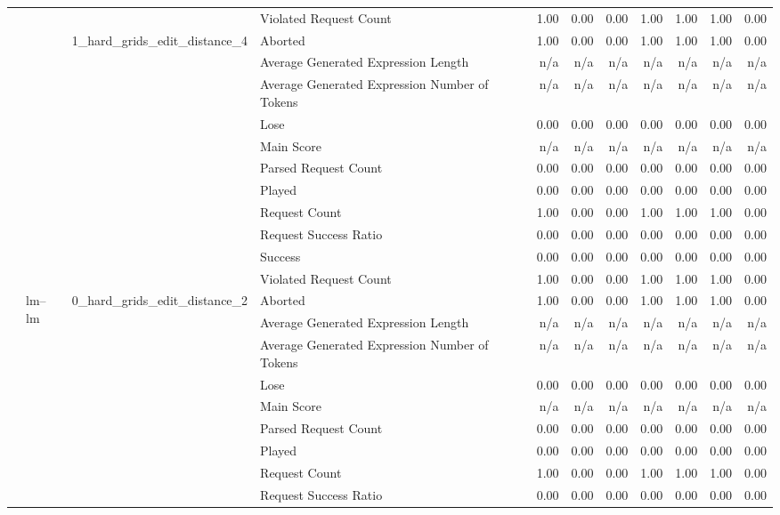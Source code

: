 \begin{tabular}{llllrrrrrrr}
 &  &  & Violated Request Count & 1.00 & 0.00 & 0.00 & 1.00 & 1.00 & 1.00 & 0.00 \\
\cline{3-11}
 &  & \multirow[t]{11}{*}{1_hard_grids_edit_distance_4} & Aborted & 1.00 & 0.00 & 0.00 & 1.00 & 1.00 & 1.00 & 0.00 \\
 &  &  & Average Generated Expression Length & n/a & n/a & n/a & n/a & n/a & n/a & n/a \\
 &  &  & Average Generated Expression Number of Tokens & n/a & n/a & n/a & n/a & n/a & n/a & n/a \\
 &  &  & Lose & 0.00 & 0.00 & 0.00 & 0.00 & 0.00 & 0.00 & 0.00 \\
 &  &  & Main Score & n/a & n/a & n/a & n/a & n/a & n/a & n/a \\
 &  &  & Parsed Request Count & 0.00 & 0.00 & 0.00 & 0.00 & 0.00 & 0.00 & 0.00 \\
 &  &  & Played & 0.00 & 0.00 & 0.00 & 0.00 & 0.00 & 0.00 & 0.00 \\
 &  &  & Request Count & 1.00 & 0.00 & 0.00 & 1.00 & 1.00 & 1.00 & 0.00 \\
 &  &  & Request Success Ratio & 0.00 & 0.00 & 0.00 & 0.00 & 0.00 & 0.00 & 0.00 \\
 &  &  & Success & 0.00 & 0.00 & 0.00 & 0.00 & 0.00 & 0.00 & 0.00 \\
 &  &  & Violated Request Count & 1.00 & 0.00 & 0.00 & 1.00 & 1.00 & 1.00 & 0.00 \\
\cline{2-11} \cline{3-11}
 & \multirow[t]{22}{*}{lm--lm} & \multirow[t]{11}{*}{0_hard_grids_edit_distance_2} & Aborted & 1.00 & 0.00 & 0.00 & 1.00 & 1.00 & 1.00 & 0.00 \\
 &  &  & Average Generated Expression Length & n/a & n/a & n/a & n/a & n/a & n/a & n/a \\
 &  &  & Average Generated Expression Number of Tokens & n/a & n/a & n/a & n/a & n/a & n/a & n/a \\
 &  &  & Lose & 0.00 & 0.00 & 0.00 & 0.00 & 0.00 & 0.00 & 0.00 \\
 &  &  & Main Score & n/a & n/a & n/a & n/a & n/a & n/a & n/a \\
 &  &  & Parsed Request Count & 0.00 & 0.00 & 0.00 & 0.00 & 0.00 & 0.00 & 0.00 \\
 &  &  & Played & 0.00 & 0.00 & 0.00 & 0.00 & 0.00 & 0.00 & 0.00 \\
 &  &  & Request Count & 1.00 & 0.00 & 0.00 & 1.00 & 1.00 & 1.00 & 0.00 \\
 &  &  & Request Success Ratio & 0.00 & 0.00 & 0.00 & 0.00 & 0.00 & 0.00 & 0.00 \\

\end{tabular}
